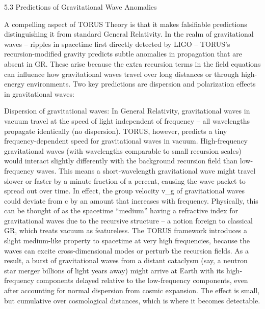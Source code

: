 \documentclass[]{article}
\begin{document}
5.3 Predictions of Gravitational Wave Anomalies

A compelling aspect of TORUS Theory is that it makes falsifiable
predictions distinguishing it from standard General Relativity. In the
realm of gravitational waves -- ripples in spacetime first directly
detected by LIGO -- TORUS's recursion-modified gravity predicts subtle
anomalies in propagation that are absent in GR. These arise because the
extra recursion terms in the field equations can influence how
gravitational waves travel over long distances or through high-energy
environments. Two key predictions are dispersion and polarization
effects in gravitational waves:

Dispersion of gravitational waves: In General Relativity, gravitational
waves in vacuum travel at the speed of light independent of frequency --
all wavelengths propagate identically (no dispersion). TORUS, however,
predicts a tiny frequency-dependent speed for gravitational waves in
vacuum. High-frequency gravitational waves (with wavelengths comparable
to small recursion scales) would interact slightly differently with the
background recursion field than low-frequency waves. This means a
short-wavelength gravitational wave might travel slower or faster by a
minute fraction of a percent, causing the wave packet to spread out over
time. In effect, the group velocity v\_g of gravitational waves could
deviate from c by an amount that increases with frequency. Physically,
this can be thought of as the spacetime ``medium'' having a refractive
index for gravitational waves due to the recursive structure -- a notion
foreign to classical GR, which treats vacuum as featureless. The TORUS
framework introduces a slight medium-like property to spacetime at very
high frequencies, because the waves can excite cross-dimensional modes
or perturb the recursion fields. As a result, a burst of gravitational
waves from a distant cataclysm (say, a neutron star merger billions of
light years away) might arrive at Earth with its high-frequency
components delayed relative to the low-frequency components, even after
accounting for normal dispersion from cosmic expansion. The effect is
small, but cumulative over cosmological distances, which is where it
becomes detectable.
\end{document}
